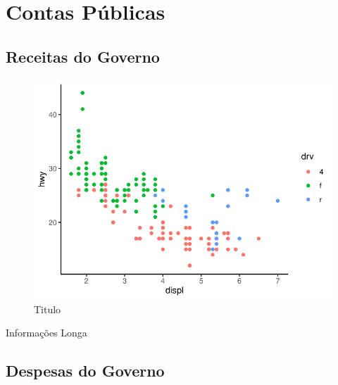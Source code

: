 \chapter{Contas Públicas}
	\section{Receitas do Governo}
	
	\lipsum[1-2]
	
	\begin{figure}[h]
			\caption{Titulo}
			\includegraphics[width=\linewidth]{fig/plot}
	\end{figure}
	
	\lipsum[1]
	
	\begin{bbox}{Informações Longa}
		\lipsum[1-2]
	\end{bbox}
	
	\section{Despesas do Governo}
	
	\lipsum[1-2]
		
